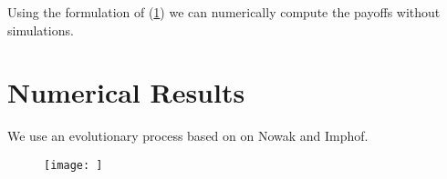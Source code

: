 \documentclass{article}
\begin{document}




Using the formulation of (\ref{}) we can numerically compute the payoffs without
simulations.


\section{Numerical Results}

We use an evolutionary process based on on Nowak and Imphof.

\begin{figure}
  \texttt{[image: ]}
\end{figure}
\end{document}
